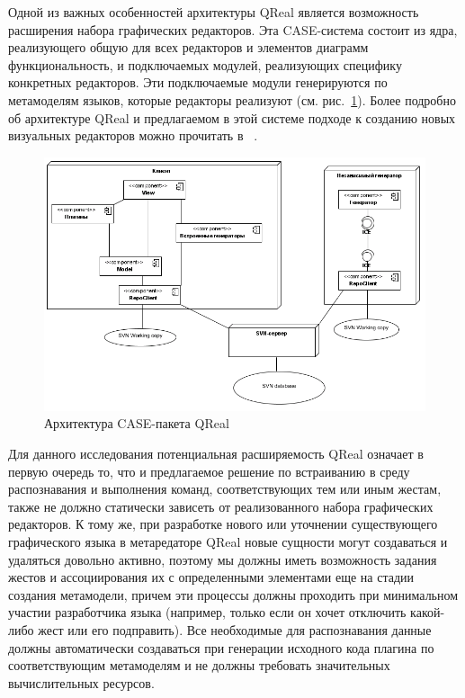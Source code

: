 \documentclass[a5paper]{article}
\begin{document}
Одной из важных особенностей архитектуры QReal является возможность расширения набора графических редакторов. Эта CASE-система состоит 
из ядра, реализующего общую для всех редакторов и элементов диаграмм функциональность, и подключаемых модулей, реализующих специфику 
конкретных редакторов. Эти подключаемые модули генерируются по метамоделям языков, которые редакторы реализуют (см. рис.~\ref{architecture}). 
Более подробно об архитектуре QReal и предлагаемом в этой системе подходе к  созданию новых визуальных редакторов можно прочитать в ~\cite{qreal}. 

\begin{figure} [ht]
  \begin{center}
    \includegraphics[width=1\textwidth, bb=0 0 798 531]{01-architecture.png}
    \caption{Архитектура CASE-пакета QReal}
    \label{architecture}
  \end{center}
\end{figure}

Для данного исследования потенциальная расширяемость QReal означает в первую очередь то, что и предлагаемое решение по встраиванию в среду 
распознавания и выполнения команд, соответствующих тем или иным жестам, также не должно статически зависеть от реализованного набора графических редакторов. 
К тому же, при разработке нового или уточнении существующего графического языка в метаредаторе QReal новые сущности могут создаваться и 
удаляться довольно активно, поэтому мы должны иметь возможность задания жестов и ассоциирования их с определенными элементами еще на стадии
создания метамодели, причем эти процессы должны проходить при минимальном участии разработчика языка (например, только если он хочет 
отключить какой-либо жест или его подправить). Все необходимые для распознавания данные должны автоматически создаваться при генерации 
исходного кода плагина по соответствующим метамоделям и не должны требовать значительных вычислительных ресурсов.
\end{document}
